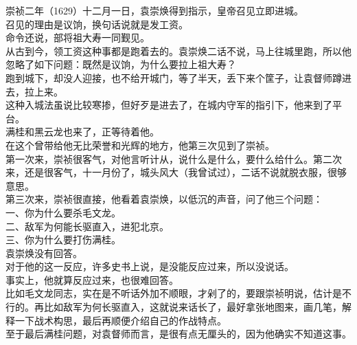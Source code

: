 \begin{multicols}{\theparacolNo}
崇祯二年（1629）十二月一日，袁崇焕得到指示，皇帝召见立即进城。\\

召见的理由是议饷，换句话说就是发工资。\\

命令还说，部将祖大寿一同觐见。\\

从古到今，领工资这种事都是跑着去的。袁崇焕二话不说，马上往城里跑，所以他忽略了如下问题：既然是议饷，为什么要拉上祖大寿？\\

跑到城下，却没人迎接，也不给开城门，等了半天，丢下来个筐子，让袁督师蹲进去，拉上来。\\

这种入城法虽说比较寒掺，但好歹是进去了，在城内守军的指引下，他来到了平台。\\

满桂和黑云龙也来了，正等待着他。\\

在这个曾带给他无比荣誉和光辉的地方，他第三次见到了崇祯。\\

第一次来，崇祯很客气，对他言听计从，说什么是什么，要什么给什么。第二次来，还是很客气，十一月份了，城头风大（我曾试过），二话不说就脱衣服，很够意思。\\

第三次来，崇祯很直接，他看着袁崇焕，以低沉的声音，问了他三个问题：\\

一、你为什么要杀毛文龙。\\

二、敌军为何能长驱直入，进犯北京。\\

三、你为什么要打伤满桂。\\

袁崇焕没有回答。\\

对于他的这一反应，许多史书上说，是没能反应过来，所以没说话。\\

事实上，他就算反应过来，也很难回答。\\

比如毛文龙同志，实在是不听话外加不顺眼，才剁了的，要跟崇祯明说，估计是不行的。再比如敌军为何长驱直入，这就说来话长了，最好拿张地图来，画几笔，解释一下战术构思，最后再顺便介绍自己的作战特点。\\

至于最后满桂问题，对袁督师而言，是很有点无厘头的，因为他确实不知道这事。\\


\end{multicols}
